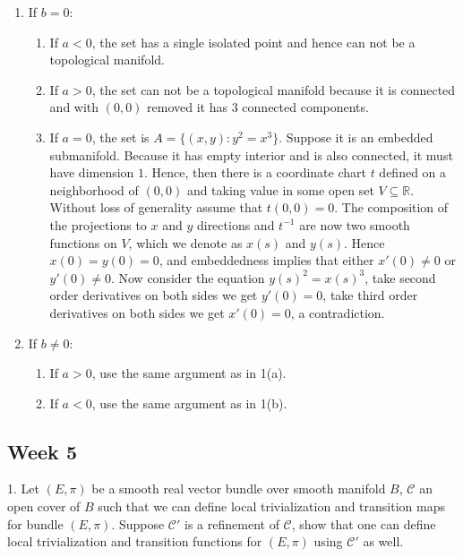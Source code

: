 \documentclass{article}
\theoremstyle{definition}
\begin{document}
\begin{enumerate}
    \item If $b=0$:
       \begin{enumerate}
           \item If $a<0$, the set has a single isolated point and hence can not be a topological manifold.
           \item If $a>0$, the set can not be a topological manifold because it is connected and with $(0, 0)$ removed it has $3$ connected components.
           \item If $a=0$, the set is $A=\{(x, y): y^2=x^3\}$. Suppose it is an embedded submanifold. Because it has empty interior and is also connected, it must have dimension $1$. Hence, then there is a coordinate chart $t$ defined on a neighborhood of $(0, 0)$ and taking value in some open set $V\subseteq\mathbb{R}$. Without loss of generality assume that $t(0, 0)=0$. The composition of the projections to $x$ and $y$ directions and $t^{-1}$ are now two smooth functions on $V$, which we denote as $x(s)$ and $y(s)$. Hence $x(0)=y(0)=0$, and embeddedness implies that either $x'(0)\not=0$ or $y'(0)\not=0$. Now consider the equation $y(s)^2=x(s)^3$, take second order derivatives on both sides we get $y'(0)=0$, take third order derivatives on both sides we get $x'(0)=0$, a contradiction.
       \end{enumerate}
    \item If $b\not=0$:
       \begin{enumerate}
           \item If $a>0$, use the same argument as in 1(a).
           \item If $a<0$, use the same argument as in 1(b).
       \end{enumerate}
       
\end{enumerate}

\subsection{Week 5}

1. Let $(E, \pi)$ be a smooth real vector bundle over smooth manifold $B$, $\mathcal{C}$ an open cover of $B$ such that we can define local trivialization and transition maps for bundle $(E, \pi)$. Suppose $\mathcal{C}'$ is a refinement of $\mathcal{C}$, show that one can define local trivialization and transition functions for $(E, \pi)$ using $\mathcal{C}'$ as well.\\
\end{document}
